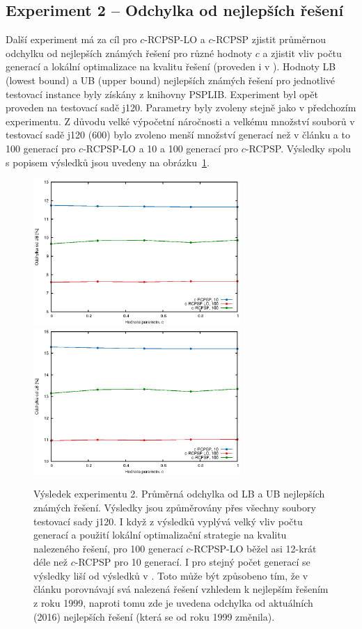 \documentclass[a4paper,12pt]{article}
\begin{document}
\subsection{Experiment 2 -- Odchylka od nejlepších řešení}
Další experiment má za cíl pro $c$-RCPSP-LO a $c$-RCPSP zjistit průměrnou odchylku od nejlepších známých řešení pro 
různé hodnoty $c$ a zjistit vliv počtu generací a lokální optimalizace na kvalitu řešení (proveden i v \cite{Merkle00antcolony}). Hodnoty LB (lowest bound) a UB (upper bound) nejlepších známých řešení pro jednotlivé testovací instance 
byly získány z knihovny PSPLIB. Experiment byl opět proveden na testovací sadě j120. Parametry byly zvoleny stejně jako v předchozím 
experimentu. Z důvodu velké výpočetní náročnosti a velkému množství souborů v testovací sadě j120 (600) bylo
zvoleno menší množství generací než v článku \cite{Merkle00antcolony} a to 100 generací pro $c$-RCPSP-LO a 10 a 100 generací pro $c$-RCPSP. Výsledky 
spolu s popisem výsledků jsou uvedeny na obrázku~\ref{img:best}.

\begin{figure}[h]
  \centering
  \includegraphics[width=0.7\textwidth]{img/j120I.eps}
  \includegraphics[width=0.7\textwidth]{img/j120II.eps}
  \caption{Výsledek experimentu 2. Průměrná odchylka od LB a UB nejlepších známých řešení. Výsledky jsou způměrovány přes
  všechny soubory testovací sady j120. I když z výsledků vyplývá velký vliv počtu generací a použití lokální optimalizační
  strategie na kvalitu nalezeného řešení, pro 100 generací $c$-RCPSP-LO běžel asi 12-krát déle než $c$-RCPSP pro 10 generací.
  I pro stejný počet generací se výsledky liší od výsledků v \cite{Merkle00antcolony}. Toto může být způsobeno tím, že v článku porovnávají
  svá nalezená řešení vzhledem k nejlepším řešením z roku 1999, naproti tomu zde je uvedena odchylka od aktuálních (2016) nejlepších
  řešení (která se od roku 1999 změnila).}
  \label{img:best}
\end{figure}
\end{document}
